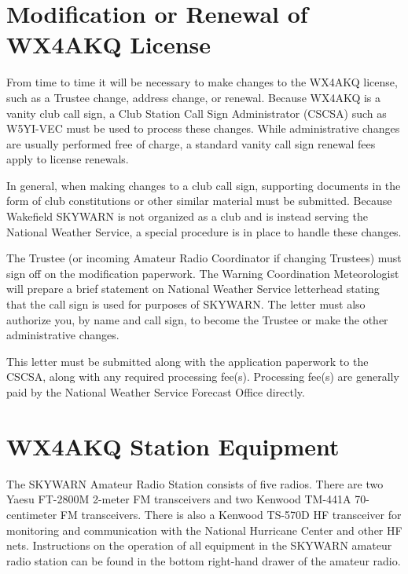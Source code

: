 \documentclass[pdflatex,letterpaper,twoside,12pt]{book}
\begin{document}

\section{Modification or Renewal of WX4AKQ License}

From time to time it will be necessary to make changes to the WX4AKQ license, such as a Trustee change, address change, or renewal.  Because WX4AKQ is a vanity club call sign, a Club Station Call Sign Administrator (CSCSA) such as W5YI-VEC must be used to process these changes. While administrative changes are usually performed free of charge, a standard vanity call sign renewal fees apply to license renewals. 

In general, when making changes to a club call sign, supporting documents in the form of club constitutions or other similar material must be submitted.  Because Wakefield SKYWARN is not organized as a club and is instead serving the National Weather Service, a special procedure is in place to handle these changes. 

The Trustee (or incoming Amateur Radio Coordinator if changing Trustees) must sign off on the modification paperwork.  The Warning Coordination Meteorologist will prepare a brief statement on National Weather Service letterhead stating that the call sign is used for purposes of SKYWARN.  The letter must also authorize you, by name and call sign, to become the Trustee or make the other administrative changes. 

This letter must be submitted along with the application paperwork to the CSCSA, along with any required processing fee(s).  Processing fee(s) are generally paid by the National Weather Service Forecast Office directly.


\section{WX4AKQ Station Equipment}

The SKYWARN Amateur Radio Station consists of five radios.  There are two Yaesu FT-2800M 2-meter FM transceivers and two Kenwood TM-441A 70-centimeter FM transceivers.  There is also a Kenwood TS-570D HF transceiver for monitoring and communication with the National Hurricane Center and other HF nets. Instructions on the operation of all equipment in the SKYWARN amateur radio station can be found in the bottom right-hand drawer of the amateur radio. 
\end{document}
